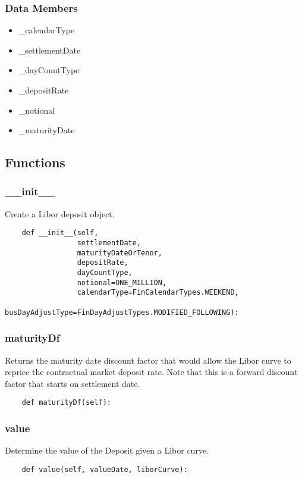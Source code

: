 \documentclass[twoside,11pt]{book}
\begin{document}
\subsubsection*{Data Members}
\begin{itemize}
\item{\_calendarType}
\item{\_settlementDate}
\item{\_dayCountType}
\item{\_depositRate}
\item{\_notional}
\item{\_maturityDate}
\end{itemize}

\subsection*{Functions}

\subsubsection*{{\bf \_\_init\_\_}}
Create a Libor deposit object.  

\begin{lstlisting}
    def __init__(self,
                 settlementDate,
                 maturityDateOrTenor,
                 depositRate,
                 dayCountType,
                 notional=ONE_MILLION,
                 calendarType=FinCalendarTypes.WEEKEND,
                 busDayAdjustType=FinDayAdjustTypes.MODIFIED_FOLLOWING):
\end{lstlisting}

\subsubsection*{{\bf maturityDf}}
Returns the maturity date discount factor that would allow the Libor curve to reprice the contractual market deposit rate. Note that this is a forward discount factor that starts on settlement date. 

\begin{lstlisting}
    def maturityDf(self):
\end{lstlisting}

\subsubsection*{{\bf value}}
Determine the value of the Deposit given a Libor curve.  

\begin{lstlisting}
    def value(self, valueDate, liborCurve):
\end{lstlisting}
\end{document}
